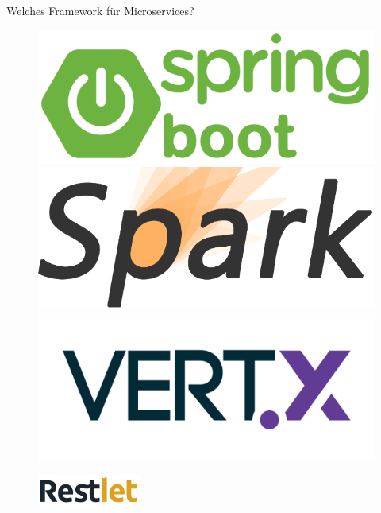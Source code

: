 \documentclass[final]{beamer}
\newlength{\onecolwid}
\newlength{\twocolwid}
\begin{document}
\begin{frame}
\begin{columns}[t]
\begin{column}{\twocolwid}
\begin{columns}[t,totalwidth=\twocolwid]
\begin{column}{\onecolwid}
\begin{block}{Welches Framework für Microservices?}

\begin{figure}
\begin{minipage}[t]{0.25\textwidth}\vspace{0pt} 
\includegraphics[width=1.0\textwidth]{spring-boot-logo} 
\end{minipage}\hfill%
\begin{minipage}[t]{0.25\textwidth}\vspace{0pt} 
\includegraphics[width=1.0\textwidth]{spark} 
\end{minipage}\hfill%
\begin{minipage}[t]{0.25\textwidth}\vspace{0pt} 
\includegraphics[width=1.0\textwidth]{vertx} 
\end{minipage}\hfill%
\end{figure}
\begin{figure}
\begin{center}
	\includegraphics[width=0.3\textwidth]{restlet}	
\end{center}
	

\end{figure}
\end{block}
\end{column}
\end{columns}
\end{column}
\end{columns}
\end{frame}
\end{document}
